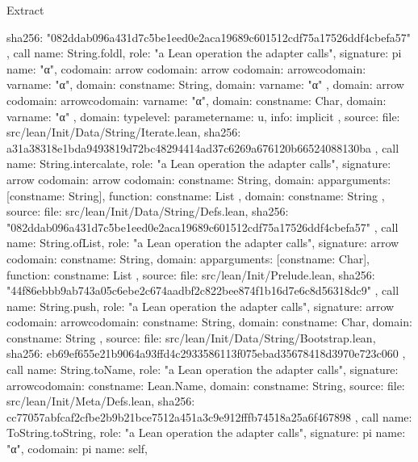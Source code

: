 \begin{lexlean}{Extract}
\begin{toolingmodule}
{{{        sha256: "082ddab096a431d7c5be1eed0e2aca19689c601512cdf75a17526ddf4cbefa57"
      }
    },
    call{
      name: String.foldl,
      role: "a Lean operation the adapter calls",
      signature: pi{
        name: "α",
        codomain: arrow{
          codomain: arrow{
            codomain: arrow{codomain: var{name: "α"}, domain: const{name: String}},
            domain: var{name: "α"}
          },
          domain: arrow{
            codomain: arrow{codomain: var{name: "α"}, domain: const{name: Char}},
            domain: var{name: "α"}
          }
        },
        domain: type{level: parameter{name: u}},
        info: implicit
      },
      source: {
        file: src/lean/Init/Data/String/Iterate.lean,
        sha256: a31a38318e1bda9493819d72bc48294414ad37c6269a676120b66524088130ba
      }
    },
    call{
      name: String.intercalate,
      role: "a Lean operation the adapter calls",
      signature: arrow{
        codomain: arrow{
          codomain: const{name: String},
          domain: app{arguments: [const{name: String}], function: const{name: List}}
        },
        domain: const{name: String}
      },
      source: {
        file: src/lean/Init/Data/String/Defs.lean,
        sha256: "082ddab096a431d7c5be1eed0e2aca19689c601512cdf75a17526ddf4cbefa57"
      }
    },
    call{
      name: String.ofList,
      role: "a Lean operation the adapter calls",
      signature: arrow{
        codomain: const{name: String},
        domain: app{arguments: [const{name: Char}], function: const{name: List}}
      },
      source: {
        file: src/lean/Init/Prelude.lean,
        sha256: "44f86ebbb9ab743a05c6ebe2c674aadbf2c822bee874f1b16d7e6c8d56318dc9"
      }
    },
    call{
      name: String.push,
      role: "a Lean operation the adapter calls",
      signature: arrow{
        codomain: arrow{codomain: const{name: String}, domain: const{name: Char}},
        domain: const{name: String}
      },
      source: {
        file: src/lean/Init/Data/String/Bootstrap.lean,
        sha256: eb69ef655e21b9064a93ffd4c2933586113f075ebad35678418d3970e723c060
      }
    },
    call{
      name: String.toName,
      role: "a Lean operation the adapter calls",
      signature: arrow{codomain: const{name: Lean.Name}, domain: const{name: String}},
      source: {
        file: src/lean/Init/Meta/Defs.lean,
        sha256: cc77057abfcaf2cfbe2b9b21bce7512a451a3c9e912fffb74518a25a6f467898
      }
    },
    call{
      name: ToString.toString,
      role: "a Lean operation the adapter calls",
      signature: pi{
        name: "α",
        codomain: pi{
          name: self,
}}}}
\end{toolingmodule}
\end{lexlean}
